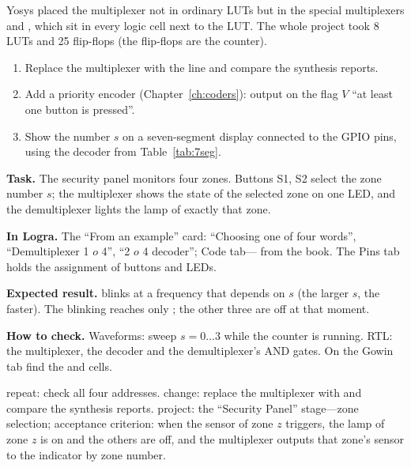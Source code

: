 \begin{infobox}
Yosys placed the multiplexer not in ordinary LUTs but in the special
multiplexers  and , which sit in every
logic cell next to the LUT. The whole project took 8 LUTs and 25 flip-flops
(the flip-flops are the counter).
\end{infobox}

\begin{taskbox}
\begin{enumerate}
  \item Replace the multiplexer with the line  and compare
        the synthesis reports.
  \item Add a priority encoder (Chapter~\ref{ch:coders}): output on
         the flag $V$ ``at least one button is pressed''.
  \item Show the number $s$ on a seven-segment display connected to the
        GPIO pins, using the decoder from Table~\ref{tab:7seg}.
\end{enumerate}
\end{taskbox}

\begin{diybox}
\textbf{Task.} The security panel monitors four zones. Buttons S1, S2 select the zone number $s$; the multiplexer shows the state of the selected zone on one LED, and the demultiplexer lights the lamp of exactly that zone.

\textbf{In Logra.} The ``From an example'' card: ``Choosing one of four words'', ``Demultiplexer 1 $	o$ 4'', ``2 $	o$ 4 decoder''; Code tab--- from the book. The Pins tab holds the assignment of buttons and LEDs.

\textbf{Expected result.}  blinks at a frequency that depends on $s$ (the larger $s$, the faster). The blinking reaches only ; the other three are off at that moment.

\textbf{How to check.} Waveforms: sweep $s=0\ldots3$ while the counter is running. RTL: the multiplexer, the decoder and the demultiplexer's AND gates. On the Gowin tab find the  and  cells.

 repeat: check all four addresses.  change: replace the multiplexer with  and compare the synthesis reports.  project: the ``Security Panel'' stage---zone selection; acceptance criterion: when the sensor of zone $z$ triggers, the lamp of zone $z$ is on and the others are off, and the multiplexer outputs that zone's sensor to the indicator by zone number.
\end{diybox}
